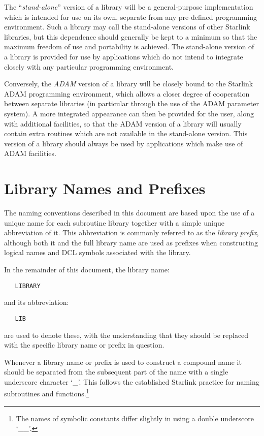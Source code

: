 The ``{\em stand-alone}'' version of a library will be a general-purpose
implementation which is intended for use on its own, separate from any
pre-defined programming environment.
Such a library may call the stand-alone versions of other Starlink
libraries, but this dependence should generally be kept to a minimum so that
the maximum freedom of use and portability is achieved.
The stand-alone version of a library is provided for use by applications
which do not intend to integrate closely with any particular programming
environment.

Conversely, the {\em ADAM} version of a library will be closely bound to the
Starlink ADAM programming environment, which allows a closer degree of
cooperation between separate libraries (in particular through the use of the
ADAM parameter system).
A more integrated appearance can then be provided for the user, along with
additional facilities, so that the ADAM version of a library will usually
contain extra routines which are not available in the stand-alone version.
This version of a library should always be used by applications which make
use of ADAM facilities.


\section{Library Names and Prefixes}

The naming conventions described in this document are based upon the use of
a unique name for each subroutine library together with a simple unique
abbreviation of it.
This abbreviation is commonly referred to as the {\em library prefix},
although both it and the full library name are used as prefixes when
constructing logical names and DCL symbols associated with the library.

In the remainder of this document, the library name:

\begin{verbatim}
   LIBRARY
\end{verbatim}

and its abbreviation:

\begin{verbatim}
   LIB
\end{verbatim}

are used to denote these, with the understanding that they should be
replaced with the specific library name or prefix in question.

Whenever a library name or prefix is used to construct a compound name it
should be separated from the subsequent part of the name with a single
underscore character `\_'.
This follows the established Starlink practice for naming subroutines and
functions.\footnote{The names of symbolic constants differ slightly in using
a double underscore `\_\_'.}

